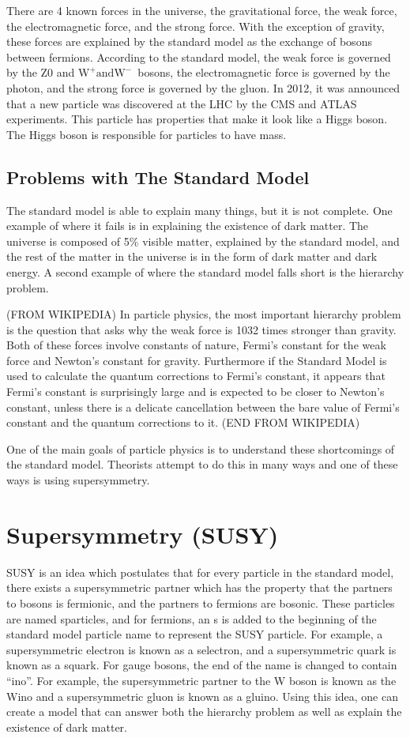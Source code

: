 There are 4 known forces in the universe, the gravitational force, the weak force, the electromagnetic force, and the strong force.
With the exception of gravity, these forces are explained by the standard model as the exchange of bosons between fermions.
According to the standard model, the weak force is governed by the Z0 and $\mathrm{W^{+} and W^{-}}$~bosons,
the electromagnetic force is governed by the photon, and the strong force is governed by the gluon.
In 2012, it was announced that a new particle was discovered at the LHC by the CMS and ATLAS experiments.
This particle has properties that make it look like a Higgs boson.
The Higgs boson is responsible for particles to have mass.

\subsection{Problems with The Standard Model}
The standard model is able to explain many things, but it is not complete.
One example of where it fails is in explaining the existence of dark matter.
The universe is composed of 5\% visible matter, explained by the standard model,
and the rest of the matter in the universe is in the form of dark matter and dark energy.
A second example of where the standard model falls short is the hierarchy problem.

(FROM WIKIPEDIA)
In particle physics, the most important hierarchy problem is the question that asks why the weak force is 1032 times stronger than gravity.
Both of these forces involve constants of nature, Fermi's constant for the weak force and Newton's constant for gravity.
Furthermore if the Standard Model is used to calculate the quantum corrections to Fermi's constant,
it appears that Fermi's constant is surprisingly large and is expected to be closer to Newton's constant,
unless there is a delicate cancellation between the bare value of Fermi's constant and the quantum corrections to it.
(END FROM WIKIPEDIA)

One of the main goals of particle physics is to understand these shortcomings of the standard model.
Theorists attempt to do this in many ways and one of these ways is using supersymmetry.

\section{Supersymmetry (SUSY)}
SUSY is an idea which postulates that for every particle in the standard model,
there exists a supersymmetric partner which has the property that the partners to bosons is fermionic, and the partners to fermions are bosonic.
These particles are named sparticles, and for fermions, an s is added to the beginning of the standard model particle name to represent the SUSY particle.
For example, a supersymmetric electron is known as a selectron, and a supersymmetric quark is known as a squark.
For gauge bosons, the end of the name is changed to contain ``ino''.
For example, the supersymmetric partner to the W boson is known as the Wino and a supersymmetric gluon is known as a gluino.
Using this idea, one can create a model that can answer both the hierarchy problem as well as explain the existence of dark matter.

